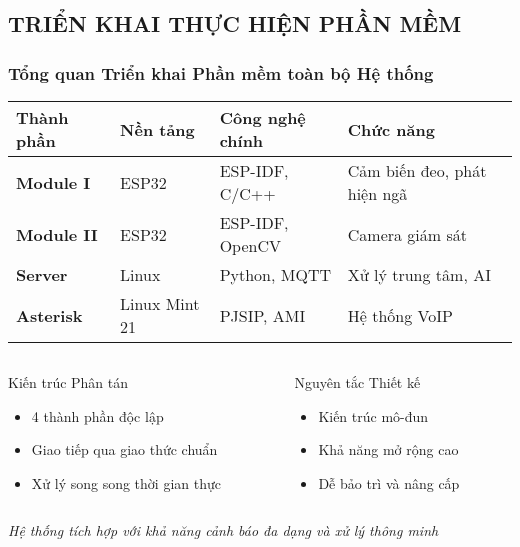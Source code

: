 \subsection{TRIỂN KHAI THỰC HIỆN PHẦN MỀM}
\begin{frame}
\frametitle{Tổng quan Triển khai Phần mềm toàn bộ Hệ thống}

\begin{table}[htbp]
\centering
\small
\begin{tabular}{|l|l|l|l|}
\hline
\textbf{Thành phần} & \textbf{Nền tảng} & \textbf{Công nghệ chính} & \textbf{Chức năng} \\
\hline
\textbf{Module I} & ESP32 & ESP-IDF, C/C++ & Cảm biến đeo, phát hiện ngã \\
\hline
\textbf{Module II} & ESP32 & ESP-IDF, OpenCV & Camera giám sát \\
\hline
\textbf{Server} & Linux & Python, MQTT & Xử lý trung tâm, AI \\
\hline
\textbf{Asterisk} & Linux Mint 21 & PJSIP, AMI & Hệ thống VoIP \\
\hline
\end{tabular}
\end{table}

\vspace{0.3cm}

\begin{columns}[t]
\begin{column}{0.48\textwidth}
\begin{block}{Kiến trúc Phân tán}
\begin{itemize}
\item 4 thành phần độc lập
\item Giao tiếp qua giao thức chuẩn
\item Xử lý song song thời gian thực
\end{itemize}
\end{block}
\end{column}

\begin{column}{0.48\textwidth}
\begin{alertblock}{Nguyên tắc Thiết kế}
\begin{itemize}
\item Kiến trúc mô-đun
\item Khả năng mở rộng cao
\item Dễ bảo trì và nâng cấp
\end{itemize}
\end{alertblock}
\end{column}
\end{columns}

\vspace{0.3cm}
\begin{center}
\textit{\small Hệ thống tích hợp với khả năng cảnh báo đa dạng và xử lý thông minh}
\end{center}

\end{frame}
